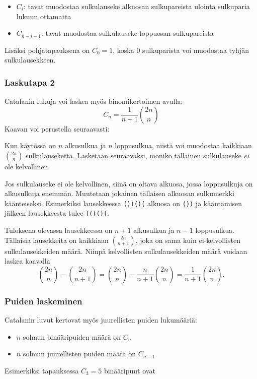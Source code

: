 \begin{itemize}
\item $C_{i}$: tavat muodostaa sulkulauseke
alkuosan sulkupareista ulointa sulkuparia lukuun ottamatta
\item $C_{n-i-1}$: tavat muodostaa sulkulauseke
loppuosan sulkupareista
\end{itemize}
Lisäksi pohjatapauksena on $C_0=1$, koska 0
sulkuparista voi muodostaa
tyhjän sulkulausekkeen.

\subsubsection{Laskutapa 2}

Catalanin lukuja voi laskea myös binomikertoimen avulla:
\[ C_n = \frac{1}{n+1} {2n \choose n}\]
Kaavan voi perustella seuraavasti:

Kun käytössä on $n$ alkusulkua ja $n$ loppusulkua,
niistä voi muodostaa kaikkiaan ${2n \choose n}$
sulkulauseketta.
Lasketaan seuraavaksi, moniko tällainen
sulkulauseke \textit{ei} ole kelvollinen.

Jos sulkulauseke ei ole kelvollinen,
siinä on oltava alkuosa,
jossa loppusulkuja on alkusulkuja enemmän.
Muutetaan jokainen tällaisen alkuosan
sulkumerkki käänteiseksi.
Esimerkiksi lausekkeessa \texttt{())()(}
alkuosa on \texttt{())} ja kääntämisen
jälkeen lausekkeesta tulee \texttt{)((()(}.

Tuloksena olevassa lausekkeessa on $n+1$ alkusulkua
ja $n-1$ loppusulkua. Tällaisia lausekkeita on
kaikkiaan ${2n \choose n+1}$,
joka on sama kuin ei-kelvollisten
sulkulausekkeiden määrä.
Niinpä kelvollisten
sulkulausekkeiden määrä voidaan laskea kaavalla
\[{2n \choose n}-{2n \choose n+1} = {2n \choose n} - \frac{n}{n+1} {2n \choose n} = \frac{1}{n+1} {2n \choose n}.\]

\subsubsection{Puiden laskeminen}

Catalanin luvut kertovat myös juurellisten
puiden lukumääriä:

\begin{itemize}
\item $n$ solmun binääripuiden määrä on $C_n$
\item $n$ solmun juurellisten puiden määrä on $C_{n-1}$
\end{itemize}
\noindent
Esimerkiksi tapauksessa $C_3=5$ binääripuut ovat

